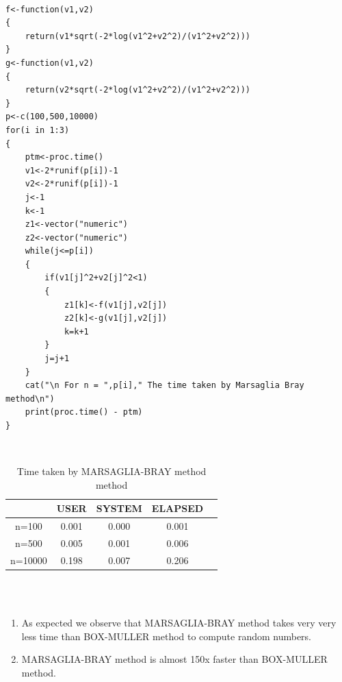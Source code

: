 \documentclass[12pt]{book}
\begin{document}
\newpage
{}\\
\begin{lstlisting}
f<-function(v1,v2)
{
	return(v1*sqrt(-2*log(v1^2+v2^2)/(v1^2+v2^2)))
}
g<-function(v1,v2)
{
	return(v2*sqrt(-2*log(v1^2+v2^2)/(v1^2+v2^2)))
}
p<-c(100,500,10000)
for(i in 1:3)
{
	ptm<-proc.time()
	v1<-2*runif(p[i])-1
	v2<-2*runif(p[i])-1
	j<-1
	k<-1
	z1<-vector("numeric")
	z2<-vector("numeric")
	while(j<=p[i])
	{
		if(v1[j]^2+v2[j]^2<1)
		{
			z1[k]<-f(v1[j],v2[j])
			z2[k]<-g(v1[j],v2[j])
			k=k+1
		}
		j=j+1
	}
	cat("\n For n = ",p[i]," The time taken by Marsaglia Bray method\n")
	print(proc.time() - ptm)
}
\end{lstlisting}


\\
\begin{table}[h!]
\centering
\begin{tabular}{||c|c|c| c|c||}
\hline
&USER &SYSTEM&ELAPSED \\
[0.5ex]
\hline\hline
n=100&0.001&0.000&0.001\\	
n=500&0.005&0.001&0.006\\
n=10000&0.198&0.007&0.206\\
[1ex]
\hline
\end{tabular}
\caption{Time taken by MARSAGLIA-BRAY method method}
\label{table:1}
\end{table}\\
\newpage
{}\\

\begin{enumerate}
\item As expected we observe that MARSAGLIA-BRAY method takes very very less time than BOX-MULLER method to compute random numbers.
\item MARSAGLIA-BRAY method is almost 150x faster than BOX-MULLER method.

\end{enumerate}
\end{document}
